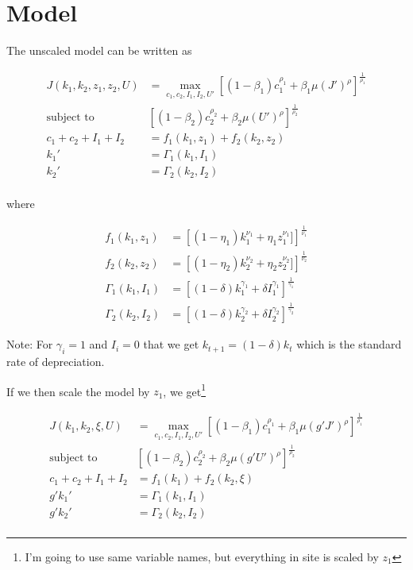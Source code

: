 \documentclass[10pt]{article}
\begin{document}
\section{Model}

  The unscaled model can be written as

  \begin{align*}
    J(k_1, k_2, z_1, z_2, U) &= \max_{c_1, c_2, I_1, I_2, U'} \left[ (1 - \beta_1) c_1^{\rho_1} + \beta_1 \mu(J')^\rho \right]^{\frac{1}{\rho_1}} \\
    \text{subject to }& \left[ (1 - \beta_2) c_2^{\rho_2} + \beta_2 \mu(U')^\rho \right]^{\frac{1}{\rho_2}} \\
    c_1 + c_2 + I_1 + I_2 &= f_1(k_1, z_1) + f_2(k_2, z_2) \\
    k_1' &= \Gamma_1(k_1, I_1) \\
    k_2' &= \Gamma_2(k_2, I_2) \\
  \end{align*}

  where

  \begin{align*}
    f_1(k_1, z_1) &= \left[(1 - \eta_1) k_1^{\nu_1} + \eta_1 z_1^{\nu_1}] \right]^{\frac{1}{\nu_1}} \\
    f_2(k_2, z_2) &= \left[(1 - \eta_2) k_2^{\nu_2} + \eta_2 z_2^{\nu_2}] \right]^{\frac{1}{\nu_2}} \\
    \Gamma_1(k_1, I_1) &= \left[(1 - \delta) k_1^{\gamma_1} + \delta I_1^{\gamma_1} \right]^{\frac{1}{\gamma_1}} \\
    \Gamma_2(k_2, I_2) &= \left[(1 - \delta) k_2^{\gamma_2} + \delta I_2^{\gamma_2} \right]^{\frac{1}{\gamma_2}}
  \end{align*}

  Note: For $\gamma_i = 1$ and $I_i = 0$ that we get $k_{t+1} = (1 - \delta) k_t$ which is the standard rate of depreciation.

  If we then scale the model by $z_1$, we get\footnote{I'm going to use same variable names, but everything in site is scaled by $z_1$}

  \begin{align*}
    J(k_1, k_2, \xi, U) &= \max_{c_1, c_2, I_1, I_2, U'} \left[ (1 - \beta_1) c_1^{\rho_1} + \beta_1 \mu(g' J')^\rho \right]^{\frac{1}{\rho_1}} \\
    \text{subject to }& \left[ (1 - \beta_2) c_2^{\rho_2} + \beta_2 \mu(g' U')^\rho \right]^{\frac{1}{\rho_2}} \\
    c_1 + c_2 + I_1 + I_2 &= f_1(k_1) + f_2(k_2, \xi) \\
    g' k_1' &= \Gamma_1(k_1, I_1) \\
    g' k_2' &= \Gamma_2(k_2, I_2) \\
  \end{align*}
\end{document}

